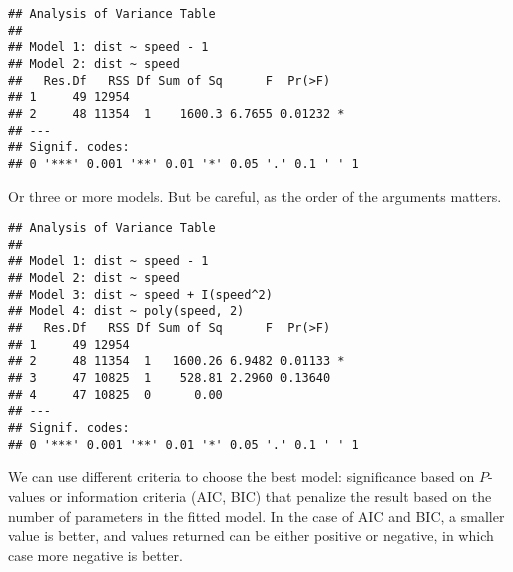 \documentclass[paper=a4,10pt,div=17,headsepline,BCOR=12mm,twoside,open=right]{scrbook}\usepackage{knitr}
\begin{document}
\begin{knitrout}\footnotesize
{}\color{fgcolor}\begin{kframe}
\begin{alltt}
\end{alltt}
\begin{verbatim}
## Analysis of Variance Table
## 
## Model 1: dist ~ speed - 1
## Model 2: dist ~ speed
##   Res.Df   RSS Df Sum of Sq      F  Pr(>F)  
## 1     49 12954                              
## 2     48 11354  1    1600.3 6.7655 0.01232 *
## ---
## Signif. codes:  
## 0 '***' 0.001 '**' 0.01 '*' 0.05 '.' 0.1 ' ' 1
\end{verbatim}
\end{kframe}
\end{knitrout}

Or three or more models. But be careful, as the order of the arguments matters.

\begin{knitrout}\footnotesize
{}\color{fgcolor}\begin{kframe}
\begin{alltt}
\end{alltt}
\begin{verbatim}
## Analysis of Variance Table
## 
## Model 1: dist ~ speed - 1
## Model 2: dist ~ speed
## Model 3: dist ~ speed + I(speed^2)
## Model 4: dist ~ poly(speed, 2)
##   Res.Df   RSS Df Sum of Sq      F  Pr(>F)  
## 1     49 12954                              
## 2     48 11354  1   1600.26 6.9482 0.01133 *
## 3     47 10825  1    528.81 2.2960 0.13640  
## 4     47 10825  0      0.00                 
## ---
## Signif. codes:  
## 0 '***' 0.001 '**' 0.01 '*' 0.05 '.' 0.1 ' ' 1
\end{verbatim}
\end{kframe}
\end{knitrout}

We can use different criteria to choose the best model: significance based on $P$-values or information criteria (AIC, BIC) that penalize the result based on the number of parameters in the fitted model. In the case of AIC and BIC, a smaller value is better, and values returned can be either positive or negative, in which case more negative is better.
\end{document}
